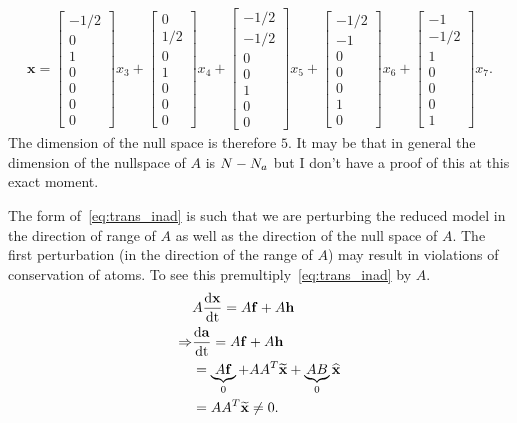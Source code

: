 \begin{align}
  \mathbf{x} = 
  \begin{bmatrix} -1/2 \\ 0 \\ 1 \\ 0 \\ 0 \\ 0 \\ 0 \end{bmatrix}x_{3} 
  + 
  \begin{bmatrix} 0 \\ 1/2 \\ 0 \\ 1 \\ 0 \\ 0 \\ 0 \end{bmatrix}x_{4} 
  + 
  \begin{bmatrix} -1/2 \\ \displaystyle -1/2 \\ 0 \\ 0 \\ 1 \\ 0 \\ 0 \end{bmatrix}x_{5} 
  + 
  \begin{bmatrix} -1/2 \\ -1 \\ 0 \\ 0 \\ 0 \\ 1 \\ 0 \end{bmatrix}x_{6} 
  + 
  \begin{bmatrix} -1 \\ -1/2 \\ 1 \\ 0 \\ 0 \\ 0 \\ 1 \end{bmatrix}x_{7}.
\end{align}
The dimension of the null space is therefore $5$.  It may be that in general 
the dimension of the nullspace of $A$ is $N - N_{a}$ but I don't have a 
proof of this at this exact moment.

The form of~\eqref{eq:trans_inad} is such that we are perturbing the 
reduced model in the direction of range of $A$ as well as the direction 
of the null space of $A$.  The first perturbation (in the direction 
of the range of $A$) may result in violations of conservation of atoms.
To see this premultiply~\eqref{eq:trans_inad} by $A$.
\begin{align}
  &A\frac{\mathrm{d} \mathbf{x}}{\mathrm{d} \mathrm{t}} = A\mathbf{f} + A\mathbf{h} \\
  \Rightarrow &\frac{\mathrm{d} \mathbf{a}}{\mathrm{d} \mathrm{t}} = A\mathbf{f} + A\mathbf{h} \\
              &= \underbrace{A\mathbf{f}}_{0} + 
                 AA^{T}\widetilde{\mathbf{x}} + 
                 \underbrace{AB}_{0}\widehat{\mathbf{x}} \\
              &= AA^{T}\widetilde{\mathbf{x}} \neq 0.
\end{align}

